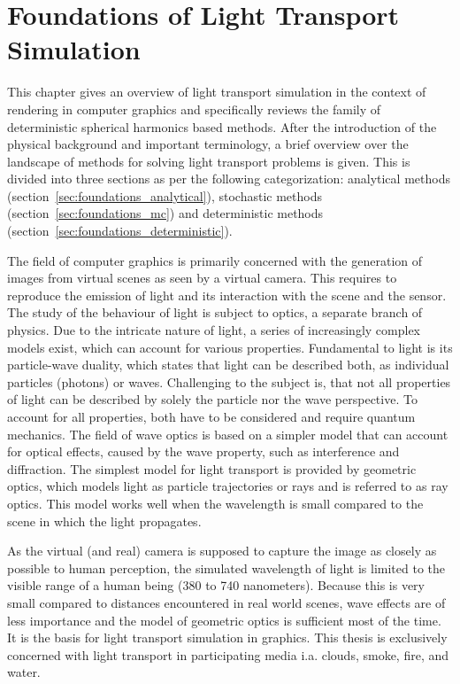 \chapter{Foundations of Light Transport Simulation}
\label{sec:foundations}

This chapter gives an overview of light transport simulation in the context of rendering in computer graphics and specifically reviews the family of deterministic spherical harmonics based methods. After the introduction of the physical background and important terminology, a brief overview over the landscape of methods for solving light transport problems is given. This is divided into three sections as per the following categorization: analytical methods (section~\ref{sec:foundations_analytical}), stochastic methods (section~\ref{sec:foundations_mc}) and deterministic methods (section~\ref{sec:foundations_deterministic}).

The field of computer graphics is primarily concerned with the generation of images from virtual scenes as seen by a virtual camera. This requires to reproduce the emission of light and its interaction with the scene and the sensor. The study of the behaviour of light is subject to optics, a separate branch of physics. Due to the intricate nature of light, a series of increasingly complex models exist, which can account for various properties. Fundamental to light is its particle-wave duality, which states that light can be described both, as individual particles (photons) or waves. Challenging to the subject is, that not all properties of light can be described by solely the particle nor the wave perspective. To account for all properties, both have to be considered and require quantum mechanics. The field of wave optics is based on a simpler model that can account for optical effects, caused by the wave property, such as interference and diffraction. The simplest model for light transport is provided by geometric optics, which models light as particle trajectories or rays and is referred to as ray optics. This model works well when the wavelength is small compared to the scene in which the light propagates. 

As the virtual (and real) camera is supposed to capture the image as closely as possible to human perception, the simulated wavelength of light is limited to the visible range of a human being (380 to 740 nanometers). Because this is very small compared to distances encountered in real world scenes, wave effects are of less importance and the model of geometric optics is sufficient most of the time. It is the basis for light transport simulation in graphics. This thesis is exclusively concerned with light transport in participating media i.a. clouds, smoke, fire, and water.


